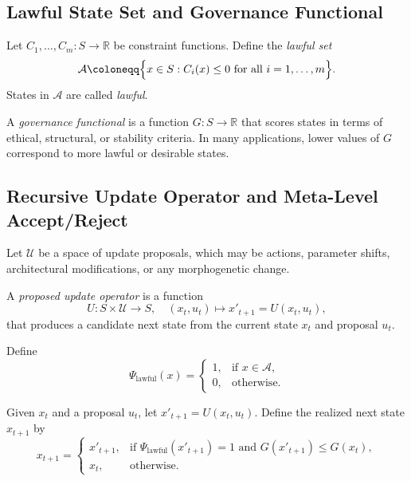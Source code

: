\documentclass[11pt]{article}
\begin{document}
\subsection{Lawful State Set and Governance Functional}

\begin{definition}
Let \(C_1, \dots, C_m : S \to \mathbb{R}\) be constraint functions.%
Define the \emph{lawful set}
\[
  \mathcal{A} \coloneqq \Bigl\{ x \in S : C_i(x) \le 0 \text{ for all } i = 1, \dots, m \Bigr\}.
\]
States in \(\mathcal{A}\) are called \emph{lawful}.
\end{definition}

\begin{definition}
A \emph{governance functional} is a function \(G : S \to \mathbb{R}\) that scores states in terms of ethical, structural, or stability criteria.%
In many applications, lower values of \(G\) correspond to more lawful or desirable states.
\end{definition}

\subsection{Recursive Update Operator and Meta-Level Accept/Reject}

Let \(\mathcal{U}\) be a space of update proposals, which may be actions, parameter shifts, architectural modifications, or any morphogenetic change.

\begin{definition}
A \emph{proposed update operator} is a function
\[
  U : S \times \mathcal{U} \to S, \quad (x_t, u_t) \mapsto x'_{t+1} = U(x_t, u_t),
\]
that produces a candidate next state from the current state \(x_t\) and proposal \(u_t\).
\end{definition}

\begin{definition}
Define
\[
  \Psi_{\mathrm{lawful}}(x) =
  \begin{cases}
    1, & \text{if } x \in \mathcal{A},\\
    0, & \text{otherwise.}
  \end{cases}
\]
\end{definition}

\begin{definition}
Given \(x_t\) and a proposal \(u_t\), let \(x'_{t+1} = U(x_t, u_t)\).%
Define the realized next state \(x_{t+1}\) by
\[
  x_{t+1} =
  \begin{cases}
    x'_{t+1}, & \text{if } \Psi_{\mathrm{lawful}}(x'_{t+1}) = 1 \text{ and } G(x'_{t+1}) \le G(x_t),\\[4pt]
    x_t,      & \text{otherwise.}
  \end{cases}
\]
\end{definition}
\end{document}
